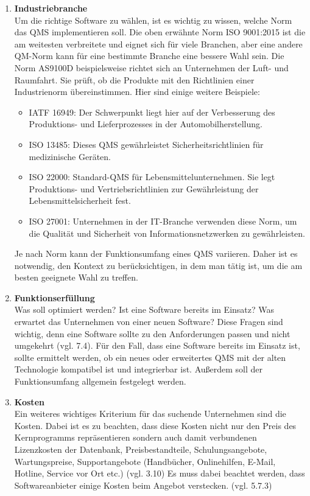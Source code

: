 \documentclass[11pt]{scrartcl}       %
\begin{document}
\begin{enumerate}

\item[] \textbf{Industriebranche} \\
Um die richtige Software zu wählen, ist es wichtig zu wissen, welche Norm das QMS implementieren soll. Die oben erwähnte Norm ISO 9001:2015 ist die am weitesten verbreitete und eignet sich für viele Branchen, aber eine andere QM-Norm kann für eine bestimmte Branche eine bessere Wahl sein. Die Norm AS9100D beispielsweise richtet sich an Unternehmen der Luft- und Raumfahrt. Sie prüft, ob die Produkte mit den Richtlinien einer Industrienorm übereinstimmen. Hier sind einige weitere Beispiele:

\begin{itemize}
\item IATF 16949: Der Schwerpunkt liegt hier auf der Verbesserung des Produktions- und Lieferprozesses in der Automobilherstellung.

\item ISO 13485: Dieses QMS gewährleistet Sicherheitsrichtlinien für medizinische Geräten.

\item ISO 22000: Standard-QMS für Lebensmittelunternehmen. Sie legt Produktions- und Vertriebsrichtlinien zur Gewährleistung der Lebensmittelsicherheit fest.

\item ISO 27001: Unternehmen in der IT-Branche verwenden diese Norm, um die Qualität und Sicherheit von Informationsnetzwerken zu gewährleisten.
\end{itemize}

Je nach Norm kann der Funktionsumfang eines QMS variieren. Daher ist es notwendig, den Kontext zu berücksichtigen, in dem man tätig ist, um die am besten geeignete Wahl zu treffen.

\item[] \textbf{Funktionserfüllung} \\
Was soll optimiert werden? Ist eine Software bereits im Einsatz? Was erwartet das Unternehmen von einer neuen Software? Diese Fragen sind wichtig, denn eine Software sollte zu den Anforderungen passen und nicht umgekehrt (vgl. \cite{gross2017professionelle} 7.4). Für den Fall, dass eine Software bereits im Einsatz ist, sollte ermittelt werden, ob ein neues oder erweitertes QMS mit der alten Technologie kompatibel ist und integrierbar ist. Außerdem soll der Funktionsumfang allgemein festgelegt werden.

\item[] \textbf{Kosten} \\
Ein weiteres wichtiges Kriterium für das suchende Unternehmen sind die Kosten. Dabei ist es zu beachten, dass diese Kosten nicht nur den Preis des Kernprogramms repräsentieren sondern auch damit verbundenen Lizenzkosten der Datenbank, Preisbestandteile, Schulungsangebote, Wartungspreise, Supportangebote (Handbücher, Onlinehilfen, E-Mail, Hotline, Service vor Ort etc.) (vgl. \cite{gross2017professionelle} 3.10) Es muss dabei beachtet werden, dass Softwareanbieter einige Kosten beim Angebot verstecken. (vgl. \cite{teich2008richtige} 5.7.3)


\end{enumerate}
\end{document}
